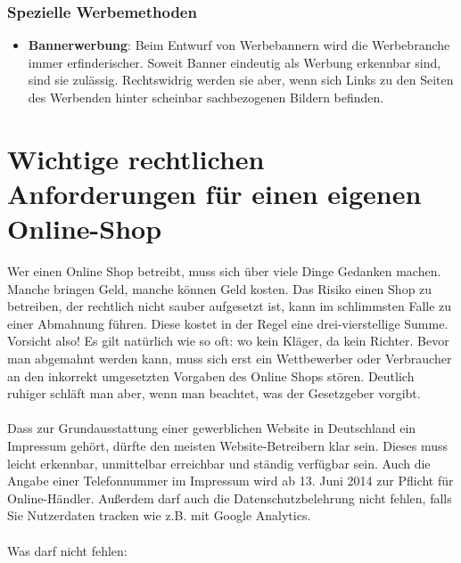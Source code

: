 \documentclass[a4paper]{article}
\begin{document}
\subsubsection{Spezielle Werbemethoden} 

\begin{itemize}
\item \textbf{Bannerwerbung}: Beim Entwurf von Werbebannern wird die Werbebranche immer erfinderischer. Soweit Banner eindeutig als Werbung erkennbar sind, sind sie zulässig. Rechtswidrig werden sie aber, wenn sich Links zu den Seiten des Werbenden hinter scheinbar sachbezogenen Bildern befinden.
\end{itemize}

\newpage
\section{Wichtige rechtlichen Anforderungen für einen eigenen Online-Shop}

Wer einen Online Shop betreibt, muss sich über viele Dinge Gedanken machen. Manche bringen Geld, manche können Geld kosten. Das Risiko einen Shop zu betreiben, der rechtlich nicht sauber aufgesetzt ist, kann im schlimmsten Falle zu einer Abmahnung führen. Diese kostet in der Regel eine drei-vierstellige Summe. Vorsicht also! Es gilt natürlich wie so oft: wo kein Kläger, da kein Richter. Bevor man abgemahnt werden kann, muss sich erst ein Wettbewerber oder Verbraucher an den inkorrekt umgesetzten Vorgaben des Online Shops stören. Deutlich ruhiger schläft man aber, wenn man beachtet, was der Gesetzgeber vorgibt.\\\\
Dass zur Grundausstattung einer gewerblichen Website in Deutschland ein Impressum gehört, dürfte den meisten Website-Betreibern klar sein. Dieses muss leicht erkennbar, unmittelbar erreichbar und ständig verfügbar sein. Auch die Angabe einer Telefonnummer im Impressum wird ab 13. Juni 2014 zur Pflicht für Online-Händler. Außerdem darf auch die Datenschutzbelehrung nicht fehlen, falls Sie Nutzerdaten tracken wie z.B. mit Google Analytics.\\\\
Was darf nicht fehlen:
\end{document}
